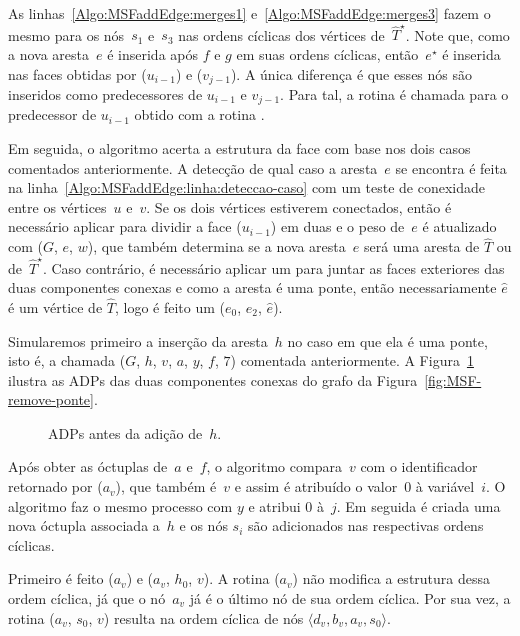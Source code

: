 As linhas~\ref{Algo:MSFaddEdge:merges1} e~\ref{Algo:MSFaddEdge:merges3} fazem o mesmo para os nós~$s_1$ e~$s_3$ nas ordens cíclicas dos vértices de~$\hat T^\star$.
Note que, como a nova aresta~$e$ é inserida após $f$ e $g$ em suas ordens cíclicas, então~$e^\star$ é inserida nas faces obtidas por \LCOFindNode($u_{i-1}$) e \LCOFindNode($v_{j-1}$).
A única diferença é que esses nós são inseridos como predecessores de $u_{i-1}$ e $v_{j-1}$.
Para tal, a rotina \LCOCycle{} é chamada para o predecessor de $u_{i-1}$ obtido com a rotina \treapPredecessor.

Em seguida, o algoritmo acerta a estrutura da face com base nos dois casos comentados anteriormente.
A detecção de qual caso a aresta~$e$ se encontra é feita na linha~\ref{Algo:MSFaddEdge:linha:deteccao-caso} com um teste de conexidade entre os vértices~$u$ e~$v$.
Se os dois vértices estiverem conectados, então é necessário aplicar \LCOSplit{} para dividir a face \LCOFindNode($u_{i-1}$) em duas e o peso de~$e$ é atualizado com \MSFupdate($G$, $e$, $w$), que também determina se a nova aresta~$e$ será uma aresta de $\hat T$ ou de~$\hat T^\star$.
Caso contrário, é necessário aplicar um \LCOMerge{} para juntar as faces exteriores das duas componentes conexas e como a aresta é uma ponte, então necessariamente $\hat e$ é um vértice de $\hat T$, logo é feito um \LCOMerge($e_0$, $e_2$, $\hat e$).

Simularemos primeiro a inserção da aresta~$h$ no caso em que ela é uma ponte, isto é, a chamada \MSFaddEdge($G$, $h$, $v$, $a$, $y$, $f$, $7$) comentada anteriormente.
A Figura~\ref{fig:MSF-adiciona-ponte-1} ilustra as ADPs das duas componentes conexas do grafo da Figura~\ref{fig:MSF-remove-ponte}.

\begin{figure}
\scalebox{1}{

}
\caption{ADPs antes da adição de~$h$.}
\label{fig:MSF-adiciona-ponte-1}
\end{figure}

Após obter as óctuplas de~$a$ e~$f$, o algoritmo compara~$v$ com o identificador retornado por \LCOFindNode($a_v$), que também é~$v$ e assim é atribuído o valor~$0$ à variável~$i$.
O algoritmo faz o mesmo processo com $y$ e atribui $0$ à~$j$.
Em seguida é criada uma nova óctupla associada a~$h$ e os nós $s_i$ são adicionados nas respectivas ordens cíclicas.

Primeiro é feito \LCOCycle($a_v$) e \LCOMerge($a_v$, $h_0$, $v$).
A rotina \LCOCycle($a_v$) não modifica a estrutura dessa ordem cíclica, já que o nó~$a_v$ já é o último nó de sua ordem cíclica.
Por sua vez, a rotina \LCOMerge($a_v$, $s_0$, $v$) resulta na ordem cíclica de nós $\langle d_v, b_v, a_v, s_0 \rangle$.

